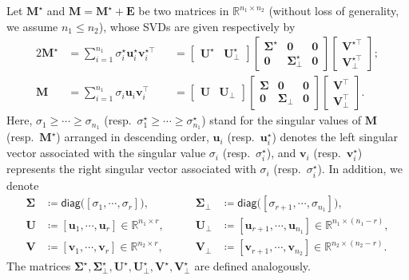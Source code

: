 Let $\bm{M}^{\star}$ and $\bm{M}=\bm{M}^{\star}+\bm{E}$ be two matrices
in $\mathbb{R}^{n_1 \times n_2}$ (without loss of generality, we assume $n_1\leq n_2$), whose SVDs
are given respectively by
%
\begin{alignat}{2}
\bm{M}^{\star} & =\sum_{i=1}^{n_1}\sigma_{i}^{\star}\bm{u}_{i}^{\star}\bm{v}_{i}^{\star\top} & & =\left[\begin{array}{cc}
\bm{U}^{\star} & \bm{U}_{\perp}^{\star}\end{array}\right]\left[\begin{array}{ccc}
\bm{\Sigma}^{\star} & \bm{0} & \bm{0}\\
\bm{0} & \bm{\Sigma}_{\perp}^{\star} & \bm{0}
\end{array}\right]\left[\begin{array}{c}
\bm{V}^{\star\top}\\
\bm{V}_{\perp}^{\star\top}
\end{array}\right];  \label{eq:Mstar-SVD} \\
\bm{M} & =\sum_{i=1}^{n_1}\sigma_{i}\bm{u}_{i}\bm{v}_{i}^{\top} & & =\left[\begin{array}{cc}
\bm{U} & \bm{U}_{\perp}\end{array}\right]\left[\begin{array}{ccc}
\bm{\Sigma} & \bm{0} & \bm{0}\\
\bm{0} & \bm{\Sigma}_{\perp} & \bm{0}
\end{array}\right]\left[\begin{array}{c}
\bm{V}^{\top}\\
\bm{V}_{\perp}^{\top}
\end{array}\right]. \label{eq:M-SVD}
\end{alignat}
%
Here, $\sigma_{1}\geq\cdots\geq\sigma_{n_1}$ (resp.~$\sigma_{1}^{\star}\geq\cdots\geq\sigma_{n_1}^{\star}$)
stand for the singular values of $\bm{M}$ (resp.~$\bm{M}^{\star}$)
arranged in descending order, $\bm{u}_{i}$ (resp\@.~$\bm{u}_{i}^{\star}$)
denotes the left singular vector associated with the singular value
$\sigma_{i}$ (resp.~$\sigma_{i}^{\star}$), and $\bm{v}_{i}$ (resp\@.~$\bm{v}_{i}^{\star}$)
represents the right singular vector associated with $\sigma_{i}$ (resp.~$\sigma_{i}^{\star}$).
In addition, we denote
%
\begin{align*}
	 \bm{\Sigma}  &\coloneqq\mathsf{diag}\big([\sigma_{1},\cdots,\sigma_{r}]\big),\quad &\bm{\Sigma}_{\perp} &\coloneqq\mathsf{diag}\big([\sigma_{r+1},\cdots,\sigma_{n_1}]\big),\\
	 \bm{U}  &\coloneqq[\bm{u}_{1},\cdots,\bm{u}_{r}]\in \mathbb{R}^{n_1\times r},\qquad &\bm{U}_{\perp} &\coloneqq[\bm{u}_{r+1},\cdots,\bm{u}_{n_1}]\in \mathbb{R}^{n_1\times (n_1-r)},\\
	 \bm{V}  &\coloneqq[\bm{v}_{1},\cdots,\bm{v}_{r}]\in \mathbb{R}^{n_2\times r},\qquad &\bm{V}_{\perp} &\coloneqq[\bm{v}_{r+1},\cdots,\bm{v}_{n_2}] \in \mathbb{R}^{n_2\times (n_2-r)}.
\end{align*}
The matrices $\bm{\Sigma}^{\star},\bm{\Sigma}_{\perp}^{\star},\bm{U}^{\star},\bm{U}_{\perp}^{\star},\bm{V}^{\star},\bm{V}_{\perp}^{\star}$
are defined analogously.


